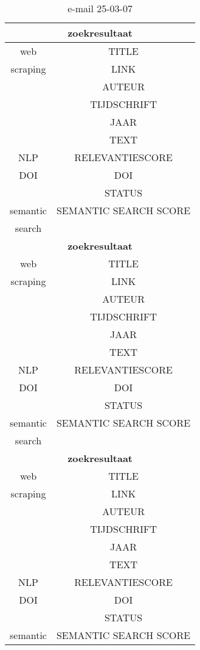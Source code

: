 \begin{table}[h!]
    \caption{e-mail 25-03-07}
    \centering
    \begin{tabular}{|c|c|} 
        \hline
        \multicolumn{2}{|c|}{\textbf{zoekresultaat}} \\
        \hline
        web &TITLE\\
        scraping&LINK\\
        &AUTEUR\\
        &TIJDSCHRIFT\\
        &JAAR\\
        &TEXT\\
        \hline
        NLP&RELEVANTIESCORE\\
        \hline
        DOI&DOI\\
        &STATUS\\
        \hline
        semantic&SEMANTIC SEARCH SCORE\\
        search&\\
        \hline
        \multicolumn{2}{|c|}{\textbf{zoekresultaat}} \\
        \hline
        web &TITLE\\
        scraping&LINK\\
        &AUTEUR\\
        &TIJDSCHRIFT\\
        &JAAR\\
        &TEXT\\
        \hline
        NLP&RELEVANTIESCORE\\
        \hline
        DOI&DOI\\
        &STATUS\\
        \hline
        semantic&SEMANTIC SEARCH SCORE\\
        search&\\
        \hline
        \multicolumn{2}{|c|}{\textbf{zoekresultaat}} \\
        \hline
        web &TITLE\\
        scraping&LINK\\
        &AUTEUR\\
        &TIJDSCHRIFT\\
        &JAAR\\
        &TEXT\\
        \hline
        NLP&RELEVANTIESCORE\\
        \hline
        DOI&DOI\\
        &STATUS\\
        \hline
        semantic&SEMANTIC SEARCH SCORE\\

\end{tabular}
\end{table}
